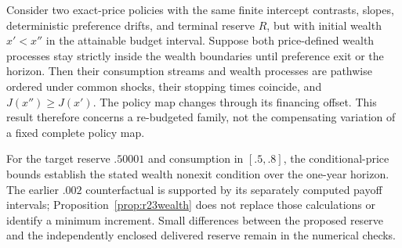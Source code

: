 \begin{proposition}\label{prop:r23wealth}
Consider two exact-price policies with the same finite intercept contrasts, slopes, deterministic preference drifts, and terminal reserve $R$, but with initial wealth $x'<x''$ in the attainable budget interval. Suppose both price-defined wealth processes stay strictly inside the wealth boundaries until preference exit or the horizon. Then their consumption streams and wealth processes are pathwise ordered under common shocks, their stopping times coincide, and $J(x'')\geq J(x')$. The policy map changes through its financing offset. This result therefore concerns a re-budgeted family, not the compensating variation of a fixed complete policy map.
\end{proposition}

For the target reserve $.50001$ and consumption in $[.5,.8]$, the conditional-price bounds establish the stated wealth nonexit condition over the one-year horizon. The earlier $.002$ counterfactual is supported by its separately computed payoff intervals; Proposition~\ref{prop:r23wealth} does not replace those calculations or identify a minimum increment. Small differences between the proposed reserve and the independently enclosed delivered reserve remain in the numerical checks.
